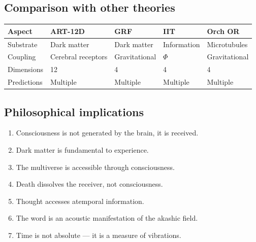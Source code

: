 \documentclass[11pt,a4paper]{article}
\begin{document}
\subsection{Comparison with other theories}
\begin{table}[H]
\centering
\begin{tabular}{@{}lllll@{}}
\toprule
\textbf{Aspect} & \textbf{ART-12D} & \textbf{GRF} & \textbf{IIT} & \textbf{Orch OR} \\ \midrule
Substrate & Dark matter & Dark matter & Information & Microtubules \\
Coupling & Cerebral receptors & Gravitational & $\Phi$ & Gravitational \\
Dimensions & 12 & 4 & 4 & 4 \\
Predictions & Multiple & Multiple & Multiple & Multiple \\ \bottomrule
\end{tabular}
\end{table}

\subsection{Philosophical implications}
\begin{enumerate}
    \item Consciousness is not generated by the brain, it is received.
    \item Dark matter is fundamental to experience.
    \item The multiverse is accessible through consciousness.
    \item Death dissolves the receiver, not consciousness.
    \item Thought accesses atemporal information.
    \item The word is an acoustic manifestation of the akashic field.
    \item Time is not absolute --- it is a measure of vibrations.
\end{enumerate}
\end{document}
